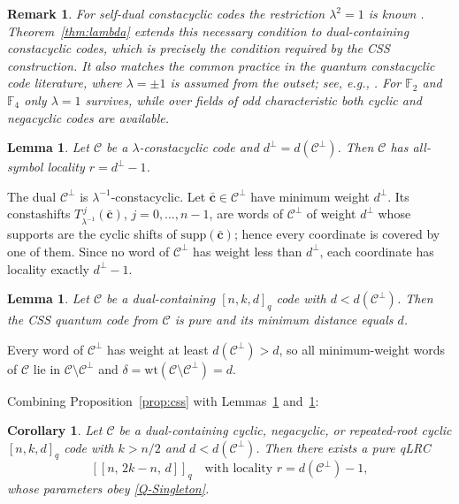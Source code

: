 \documentclass[journal,onecolumn]{IEEEtran}
\newtheorem{lem}[thm]{Lemma}
\newtheorem{cor}[thm]{Corollary}
\newtheorem{remark}{Remark}
\newcommand{\Ff}{{\mathbb F}}
\newcommand{\cc}{{\mathcal C}}
\newcommand{\dsb}[1]{[\![#1]\!]}
\begin{document}
\begin{remark}
For \emph{self-dual} constacyclic codes the restriction $\lambda^2=1$ is known \cite[Corollary~2]{Blackford2013}. Theorem~\ref{thm:lambda} extends this necessary condition to \emph{dual-containing} constacyclic codes, which is precisely the condition required by the CSS construction. It also matches the common practice in the quantum constacyclic code literature, where $\lambda=\pm 1$ is assumed from the outset; see, e.g., \cite{Ketkar2006}.
For $\Ff_2$ and $\Ff_4$ only $\lambda=1$ survives, while over fields of odd characteristic both cyclic and negacyclic codes are available.
\end{remark}

\begin{lem}\label{lem:locality}
Let $\cc$ be a $\lambda$-constacyclic code and $d^\perp=d(\cc^\perp)$. Then $\cc$ has all-symbol locality $r=d^\perp-1$.
\end{lem}

\begin{IEEEproof}
The dual $\cc^\perp$ is $\lambda^{-1}$-constacyclic. Let $\bar{\mathbf c}\in\cc^\perp$ have minimum weight $d^\perp$. Its constashifts $T_{\lambda^{-1}}^{\,j}(\bar{\mathbf c})$, $j=0,\dots,n-1$, are words of $\cc^\perp$ of weight $d^\perp$ whose supports are the cyclic shifts of $\mathrm{supp}(\bar{\mathbf c})$; hence every coordinate is covered by one of them. Since no word of $\cc^\perp$ has weight less than $d^\perp$, each coordinate has locality exactly $d^\perp-1$.
\end{IEEEproof}

\begin{lem}\label{lem:pure}
Let $\cc$ be a dual-containing $[n,k,d]_q$ code with $d<d(\cc^\perp)$. Then the CSS quantum code from $\cc$ is pure and its minimum distance equals $d$.
\end{lem}

\begin{IEEEproof}
Every word of $\cc^\perp$ has weight at least $d(\cc^\perp)>d$, so all minimum-weight words of $\cc$ lie in $\cc\setminus\cc^\perp$ and $\delta=\mathrm{wt}(\cc\setminus\cc^\perp)=d$.
\end{IEEEproof}

Combining Proposition~\ref{prop:css} with Lemmas~\ref{lem:locality} and~\ref{lem:pure}:

\begin{cor}\label{cor:main}
Let $\cc$ be a dual-containing cyclic, negacyclic, or repeated-root cyclic $[n,k,d]_q$ code with $k>n/2$ and $d<d(\cc^\perp)$. Then there exists a pure qLRC
\[
\dsb{n,\,2k-n,\,d}_q \quad\text{with locality } r=d(\cc^\perp)-1,
\]
whose parameters obey \eqref{Q-Singleton}.
\end{cor}
\end{document}
